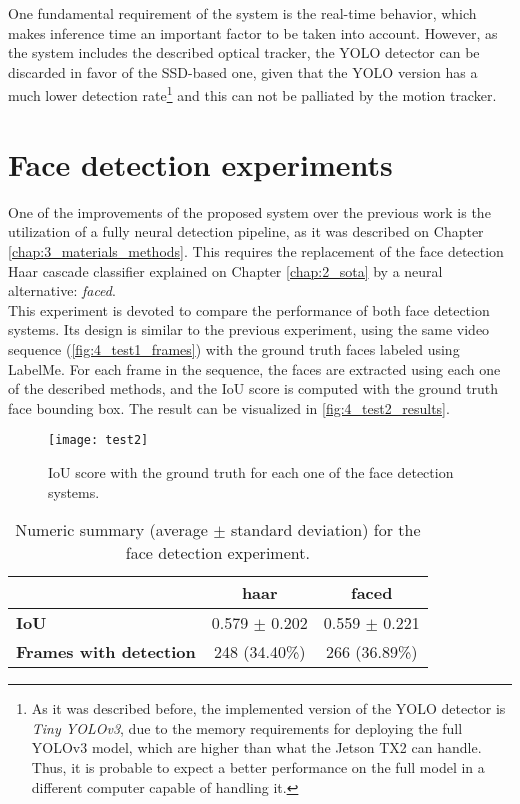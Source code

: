 One fundamental requirement of the system is the real-time behavior, which makes inference time an important factor to be taken into account. However, as the system includes the described optical tracker, the YOLO detector can be discarded in favor of the SSD-based one, given that the YOLO version has a much lower detection rate\footnote{As it was described before, the implemented version of the YOLO detector is \textit{Tiny YOLOv3}, due to the memory requirements for deploying the full YOLOv3 model, which are higher than what the Jetson TX2 can handle. Thus, it is probable to expect a better performance on the full model in a different computer capable of handling it.} and this can not be palliated by the motion tracker.\\



\section{Face detection experiments}
\label{sec:4_test2}

One of the improvements of the proposed system over the previous work \cite{tfg} is the utilization of a fully neural detection pipeline, as it was described on Chapter \ref{chap:3_materials_methods}. This requires the replacement of the face detection Haar cascade classifier explained on Chapter \ref{chap:2_sota} by a neural alternative: \textit{faced}.\\

 This experiment is devoted to compare the performance of both face detection systems. Its design is similar to the previous experiment, using the same video sequence (\autoref{fig:4_test1_frames}) with the ground truth faces labeled using LabelMe. For each frame in the sequence, the faces are extracted using each one of the described methods, and the IoU score is computed with the ground truth face bounding box. The result can be visualized in \autoref{fig:4_test2_results}.

\begin{figure}[h]
	\centering
	\texttt{[image: test2]}
	\caption{IoU score with the ground truth for each one of the face detection systems.}
	\label{fig:4_test2_results}
\end{figure}

\begin{table}[h]
	\begin{tabular}{|l|c|c|}
		\hline
		& \textbf{haar}             & \textbf{faced}              \\ \hline
		\textbf{IoU}            & 0.579 $\pm$  0.202 & 0.559 $\pm$  0.221 \\ \hline
		\textbf{Frames with detection} & 248 (34.40\%) & 266 (36.89\%) \\ \hline
	\end{tabular}
	\caption{Numeric summary (average $\pm$ standard deviation) for the face detection experiment.}
	\label{tab:4_test2}
\end{table}



